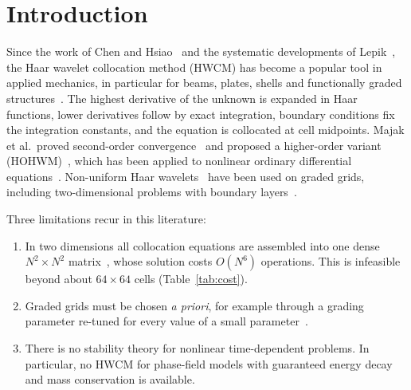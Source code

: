 \documentclass[preprint,12pt]{elsarticle}
\theoremstyle{remark}
\begin{document}
\section{Introduction}
Since the work of Chen and Hsiao~\cite{chen1997haar} and the systematic developments of
Lepik~\cite{lepik2005numerical,lepik2007application,lepik2011solving,lepik2014book}, the Haar wavelet
collocation method (HWCM) has become a popular tool in applied mechanics, in particular for beams,
plates, shells and functionally graded structures~\cite{majak2015accuracy,majak2015convergence,majak2018higher}.
The highest derivative of the unknown is expanded in Haar functions, lower derivatives follow by exact
integration, boundary conditions fix the integration constants, and the equation is collocated at cell
midpoints. Majak et al.\ proved second-order convergence~\cite{majak2015convergence} and proposed a
higher-order variant (HOHWM)~\cite{majak2018higher}, which has been applied to nonlinear ordinary
differential equations~\cite{ratas2021solving}. Non-uniform Haar
wavelets~\cite{dubeau2004nonuniform,lepik2008nonuniform} have been used on graded grids, including
two-dimensional problems with boundary layers~\cite{oruc2019nonuniform}.

Three limitations recur in this literature:
\begin{enumerate}
\item In two dimensions all collocation equations are assembled into one dense $N^2\times N^2$
matrix~\cite{lepik2011solving,oruc2019nonuniform}, whose solution costs $O(N^6)$ operations. This is
infeasible beyond about $64\times64$ cells (Table~\ref{tab:cost}).
\item Graded grids must be chosen \emph{a priori}, for example through a grading parameter re-tuned for
every value of a small parameter~\cite{oruc2019nonuniform}.
\item There is no stability theory for nonlinear time-dependent problems. In particular, no HWCM for
phase-field models with guaranteed energy decay and mass conservation is available.
\end{enumerate}
\end{document}
